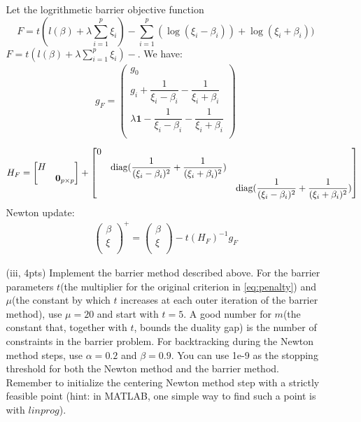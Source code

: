 \documentclass{article}
\theoremstyle{remark}
\theoremstyle{definition}
\newcommand{\diag}{\mathop{\rm diag}}
\begin{document}
\begin{enumerate}[(a)]
\begin{enumerate}
{	    Let the logrithmetic barrier objective function
	    \[F=t(l(\beta) + \lambda\sum_{i=1}^p \xi_i)-\sum_{i=1}^p(\log(\xi_i-\beta_i))+\log(\xi_i+\beta_i))\]
	    $F = t(l(\beta) + \lambda\sum_{i=1}^p \xi_i)-$. We have:
	    \begin{align*}
	        g_F =
	        \begin{pmatrix}
	        g_0 \\
	        g_i + \dfrac{1}{\xi_i-\beta_i} - \dfrac{1}{\xi_i+\beta_i}\\
	        \lambda \mathbf{1} - \dfrac{1}{\xi_i-\beta_i} - \dfrac{1}{\xi_i+\beta_i}\\
	        \end{pmatrix}
	    \end{align*}
	    \begin{align*}
	        H_F =
	        \begin{bmatrix}
	        H &  \\
	         & \mathbf{0}_{p\times p} \\
	        \end{bmatrix}+
	        \begin{bmatrix}
	        0 & &\\
	         & \diag(\dfrac{1}{(\xi_i-\beta_i)^2}+\dfrac{1}{(\xi_i+\beta_i)^2}) & \\
	         & & \diag(\dfrac{1}{(\xi_i-\beta_i)^2}+\dfrac{1}{(\xi_i+\beta_i)^2}) \\
	        \end{bmatrix}
	    \end{align*}
	    Newton update:
	    \begin{align*}
	        \begin{pmatrix}
	        \beta \\
	        \xi \\
	        \end{pmatrix}^+ = 
	        \begin{pmatrix}
	        \beta \\
	        \xi \\
	        \end{pmatrix} - t (H_F)^{-1}g_F
	    \end{align*}
	    }
	    \item[(iii, 4pts)] Implement the barrier method described above. For the barrier parameters $t$(the multiplier for the original criterion in \eqref{eq:penalty}) and $\mu$(the constant by which $t$ increases at each outer iteration of the barrier method), use $\mu=20$ and start with $t=5$. A good number for $m$(the constant that, together with $t$, bounds the duality gap) is the number of constraints in the barrier problem. For backtracking during the Newton method steps, use $\alpha=0.2$ and $\beta=0.9$. You can use 1e-9 as the stopping threshold for both the Newton method and the barrier method. Remember to initialize the centering Newton method step with a strictly feasible point (hint: in MATLAB, one simple way to find such a point is with $linprog$).
    

\end{enumerate}
\end{enumerate}
\end{document}
